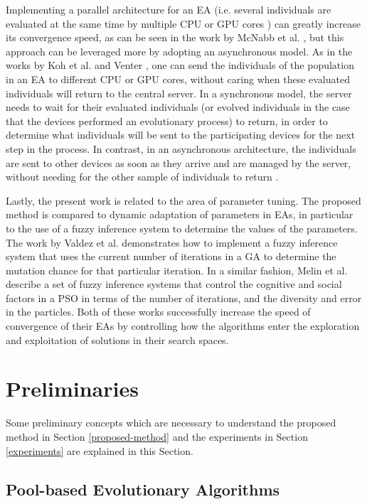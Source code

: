 Implementing a parallel architecture for an EA (i.e. several individuals are evaluated at the same time by multiple CPU or GPU cores \cite{mussi2011gpu}) can greatly increase its convergence speed, as can be seen in the work by McNabb et al. \cite{mcnabb2007parallel}, but this approach can be leveraged more by adopting an asynchronous model. As in the works by Koh et al. \cite{koh2006parallel} and Venter \cite{venter2006parallel}, one can send the individuals of the population in an EA to different CPU or GPU cores, without caring when these evaluated individuals will return to the central server. In a synchronous model, the server needs to wait for their evaluated individuals (or evolved individuals in the case that the devices performed an evolutionary process) to return, in order to determine what individuals will be sent to the participating devices for the next step in the process. In contrast, in an asynchronous architecture, the individuals are sent to other devices as soon as they arrive and are managed by the server, without needing for the other sample of individuals to return \cite{roy2009distributed}.

Lastly, the present work is related to the area of parameter tuning. The proposed method is compared to dynamic adaptation of parameters in EAs, in particular to the use of a fuzzy inference system to determine the values of the parameters. The work by Valdez et al. \cite{valdez2010fuzzy} demonstrates how to implement a fuzzy inference system that uses the current number of iterations in a GA to determine the mutation chance for that particular iteration. In a similar fashion, Melin et al. \cite{melin2013optimal} describe a set of fuzzy inference systems that control the cognitive and social factors in a PSO in terms of the number of iterations, and the diversity and error in the particles. Both of these works successfully increase the speed of convergence of their EAs by controlling how the algorithms enter the exploration and exploitation of solutions in their search spaces.

\section{Preliminaries}
\label{preliminaries}

Some preliminary concepts which are necessary to understand the proposed method in Section \ref{proposed-method} and the experiments in Section \ref{experiments} are explained in this Section.

\subsection{Pool-based Evolutionary Algorithms}

